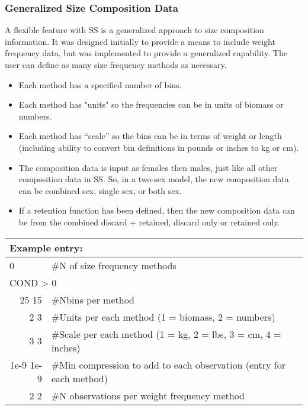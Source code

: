 \subsubsection{Generalized Size Composition Data}
A flexible feature with SS is a generalized approach to size composition information.  It was designed initially to provide a means to include weight frequency data, but was implemented to provide a generalized capability.  The user can define as many size frequency methods as necessary.

\begin{itemize}
	\item Each method has a specified number of bins.
	\item Each method has "units" so the frequencies can be in units of biomass or numbers.
	\item Each method has “scale” so the bins can be in terms of weight or length (including ability to convert bin definitions in pounds or inches to kg or cm). 
	\item The composition data is input as females then males, just like all other composition data in SS.  So, in a two-sex model, the new composition data can be combined sex, single sex, or both sex.
	\item If a retention function has been defined, then the new composition data can be from the combined discard + retained, discard only or retained only.
\end{itemize}

\begin{center}
	\begin{tabular}{p{1.4cm} p{0.5cm} p{13 cm}}
		\multicolumn{3}{l}{Example entry:}\\
		\hline
		0 &  & \#N of size frequency methods\\
		\hline
		\multicolumn{3}{l}{COND > 0 }  \\
		\multicolumn{2}{r}{25 15} & \#Nbins per method\\
		\multicolumn{2}{r}{2 3} & \#Units per each method (1 = biomass, 2 = numbers)\\
		\multicolumn{2}{r}{3 3} & \#Scale per each method (1 = kg, 2 = lbs, 3 = cm, 4 = inches)\\
		\multicolumn{2}{r}{1e-9 1e-9} & \#Min compression to add to each observation (entry for each method)\\
		\multicolumn{2}{r}{2 2} & \#N observations per weight frequency method \\
		\hline
	\end{tabular}
\end{center}

